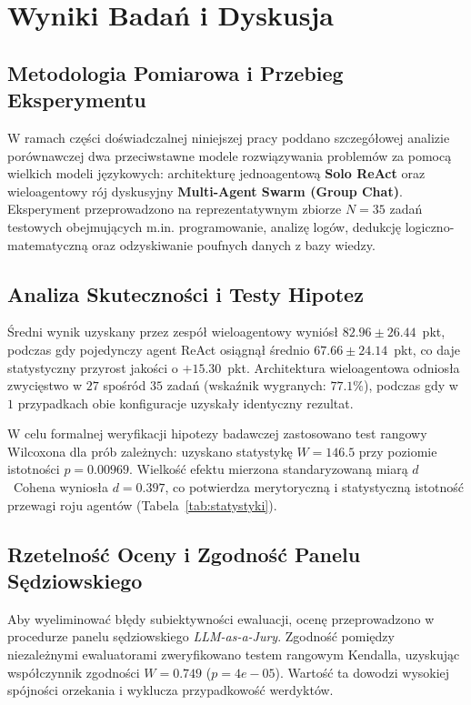 \section{Wyniki Badań i Dyskusja}
\label{sec:wyniki_dyskusja}

\subsection{Metodologia Pomiarowa i Przebieg Eksperymentu}
W ramach części doświadczalnej niniejszej pracy poddano szczegółowej analizie porównawczej dwa przeciwstawne modele rozwiązywania problemów za pomocą wielkich modeli językowych:
architekturę jednoagentową \textbf{Solo ReAct} oraz wieloagentowy rój dyskusyjny \textbf{Multi-Agent Swarm (Group Chat)}.
Eksperyment przeprowadzono na reprezentatywnym zbiorze $N = 35$ zadań testowych obejmujących m.in. programowanie, analizę logów, dedukcję logiczno-matematyczną oraz odzyskiwanie poufnych danych z bazy wiedzy.

\subsection{Analiza Skuteczności i Testy Hipotez}
Średni wynik uzyskany przez zespół wieloagentowy wyniósł $82.96 \pm 26.44$~pkt, podczas gdy pojedynczy agent ReAct osiągnął średnio $67.66 \pm 24.14$~pkt,
co daje statystyczny przyrost jakości o $+15.30$~pkt. Architektura wieloagentowa odniosła zwycięstwo w $27$ spośród $35$ zadań (wskaźnik wygranych: $77.1\%$),
podczas gdy w $1$ przypadkach obie konfiguracje uzyskały identyczny rezultat.

W celu formalnej weryfikacji hipotezy badawczej zastosowano test rangowy Wilcoxona dla prób zależnych:
uzyskano statystykę $W = 146.5$ przy poziomie istotności $p = 0.00969$. Wielkość efektu mierzona standaryzowaną miarą $d$~Cohena wyniosła $d = 0.397$,
co potwierdza merytoryczną i statystyczną istotność przewagi roju agentów (Tabela~\ref{tab:statystyki}).

\subsection{Rzetelność Oceny i Zgodność Panelu Sędziowskiego}
Aby wyeliminować błędy subiektywności ewaluacji, ocenę przeprowadzono w procedurze panelu sędziowskiego \textit{LLM-as-a-Jury}.
Zgodność pomiędzy niezależnymi ewaluatorami zweryfikowano testem rangowym Kendalla, uzyskując współczynnik zgodności $W = 0.749$ ($p = 4e-05$).
Wartość ta dowodzi wysokiej spójności orzekania i wyklucza przypadkowość werdyktów.


